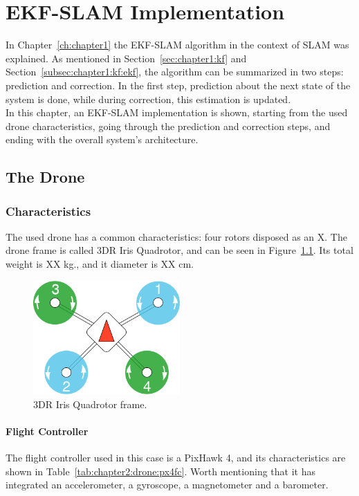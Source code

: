 \chapter{EKF-SLAM Implementation}
\label{ch:chapter2}
In Chapter~\ref{ch:chapter1} the EKF-SLAM algorithm in the context of SLAM was explained. As mentioned in Section~\ref{sec:chapter1:kf} and Section~\ref{subsec:chapter1:kf:ekf}, the algorithm can be summarized in two steps: prediction and correction. In the first step, prediction about the next state of the system is done, while during correction, this estimation is updated. \\

In this chapter, an EKF-SLAM implementation is shown, starting from the used drone characteristics, going through the prediction and correction steps, and ending with the overall system's architecture.

\section{The Drone}
\label{sec:chapter2:drone}
\subsection{Characteristics}
\label{subsec:chapter2:drone:characteristics}
The used drone has a common characteristics: four rotors disposed as an X. The drone frame is called 3DR Iris Quadrotor, and can be seen in Figure~\ref{fig:chapter2:drone:frame}. Its total weight is XX kg., and it diameter is XX cm.\\

\begin{figure}[h]
    \centering
    \includegraphics[width=0.5\textwidth]{Figures/fig4-quad-frame.png}
    \caption{3DR Iris Quadrotor frame.}
    \label{fig:chapter2:drone:frame}
\end{figure}

\subsubsection{Flight Controller}
The flight controller used in this case is a PixHawk 4, and its characteristics are shown in Table~\ref{tab:chapter2:drone:px4fc}. Worth mentioning that it has integrated an accelerometer, a gyroscope, a magnetometer and a barometer.

